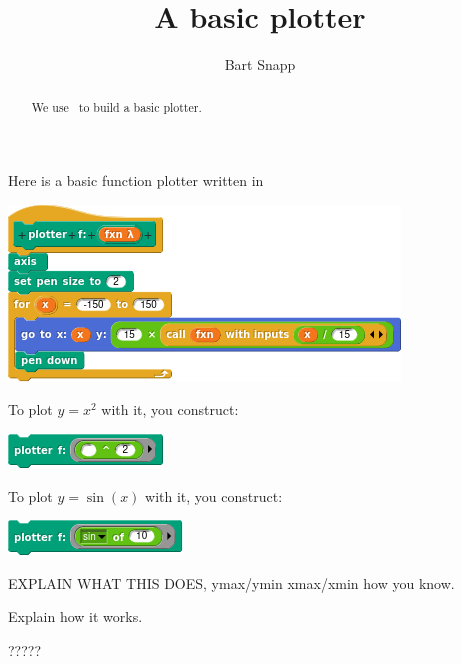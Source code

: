 \documentclass[noauthor,nooutcomes,12pt]{ximera}
\title{A basic plotter}
\author{Bart Snapp}
\begin{document}
\begin{abstract}
  We use \snap\ to build a basic plotter.
\end{abstract}
\maketitle

\begin{question}
  Here is a basic function plotter written in \snap\
  \begin{center}
    \includegraphics{plotter-script.png}
  \end{center}
  To plot $y=x^2$ with it, you construct:
  \begin{center}
    \includegraphics{plotter-eg-x2-script.png}
  \end{center}
  To plot $y=\sin(x)$ with it, you construct:
  \begin{center}
    \includegraphics{plotter-eg-sin-script.png}
  \end{center}

  EXPLAIN WHAT THIS DOES, ymax/ymin xmax/xmin how you know.
  
\end{question}
\mynewpage

\begin{question}
 Explain how it works. 
\end{question}
\mynewpage

\begin{question}
  ?????
\end{question}
\end{document}
